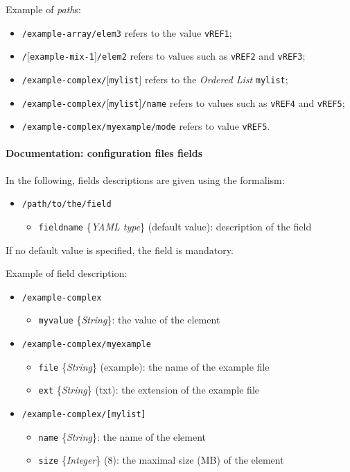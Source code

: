 \documentclass[a4wide,10pt,oneside]{book}
\newcommand{\ypath}[1]{\texttt{#1}}
\newcommand{\yfield}[2]{\texttt{#1} {\small\{{\emph{#2}}\}}:}
\newcommand{\yfieldd}[3]{\texttt{#1} {\small\{{\emph{#2}}\}} {\small(}#3{\small)}:}
\begin{document}
Example of \emph{path}s:
\begin{itemize}
  \item \texttt{\small /example-array/elem3} refers to the value \texttt{\small vREF1};
  \item \texttt{\small /$[$example-mix-1$]$/elem2} refers to values such as \texttt{\small vREF2} and \texttt{\small vREF3};
  \item \texttt{\small /example-complex/$[$mylist$]$} refers to the \emph{Ordered List} \texttt{\small mylist};
  \item \texttt{\small /example-complex/$[$mylist$]$/name} refers to values such as \texttt{\small vREF4} and \texttt{\small vREF5};
  \item \texttt{\small /example-complex/myexample/mode} refers to value \texttt{\small vREF5}.
\end{itemize}

\paragraph{Documentation: configuration files fields\\}
In the following, fields descriptions are given using the formalism:
\begin{itemize}
  \item \ypath{/path/to/the/field}
  \begin{itemize}
    \item \yfieldd{fieldname}{YAML type}{default value} description of the field
  \end{itemize}
\end{itemize}
If no default value is specified, the field is mandatory.

Example of field description:
\begin{itemize}
  \item \ypath{/example-complex}
  \begin{itemize}
    \item \yfield{myvalue}{String} the value of the element
  \end{itemize}
  \item \ypath{/example-complex/myexample}
  \begin{itemize}
    \item \yfieldd{file}{String}{example} the name of the example file
    \item \yfieldd{ext}{String}{txt} the extension of the example file
  \end{itemize}
  \item \ypath{/example-complex/[mylist]}
  \begin{itemize}
    \item \yfield{name}{String} the name of the element
    \item \yfieldd{size}{Integer}{8} the maximal size (MB) of the element
  \end{itemize}
\end{itemize}
\end{document}
